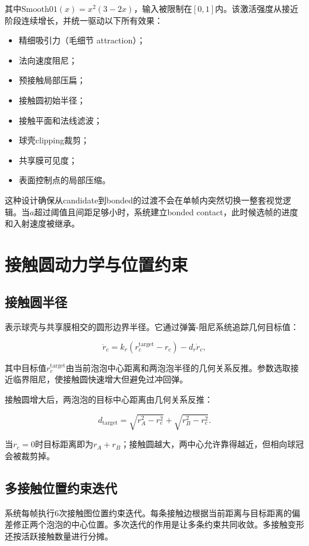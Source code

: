 其中$\mathrm{Smooth01}(x) = x^2(3-2x)$，输入被限制在$[0,1]$内。该激活强度从接近阶段连续增长，并统一驱动以下所有效果：

\begin{itemize}
  \item 精细吸引力（毛细节 attraction）；
  \item 法向速度阻尼；
  \item 预接触局部压扁；
  \item 接触圆初始半径；
  \item 接触平面和法线滤波；
  \item 球壳clipping裁剪；
  \item 共享膜可见度；
  \item 表面控制点的局部压缩。
\end{itemize}

这种设计确保从candidate到bonded的过渡不会在单帧内突然切换一整套视觉逻辑。当$a$超过阈值且间距足够小时，系统建立bonded contact，此时候选帧的进度和入射速度被继承。

\section{接触圆动力学与位置约束}

\subsection{接触圆半径}

表示球壳与共享膜相交的圆形边界半径。它通过弹簧-阻尼系统追踪几何目标值：

\[
\ddot{r}_c = k_r(r_c^{\mathrm{target}} - r_c) - d_r \dot{r}_c,
\]

其中目标值$r_c^{\mathrm{target}}$由当前泡泡中心距离和两泡泡半径的几何关系反推。参数选取接近临界阻尼，使接触圆快速增大但避免过冲回弹。

接触圆增大后，两泡泡的目标中心距离由几何关系反推：

\[
d_{\mathrm{target}} = \sqrt{r_A^2 - r_c^2} + \sqrt{r_B^2 - r_c^2}.
\]

当$r_c=0$时目标距离即为$r_A+r_B$；接触圆越大，两中心允许靠得越近，但相向球冠会被裁剪掉。

\subsection{多接触位置约束迭代}

系统每帧执行6次接触图位置约束迭代。每条接触边根据当前距离与目标距离的偏差修正两个泡泡的中心位置。多次迭代的作用是让多条约束共同收敛。多接触变形还按活跃接触数量进行分摊。

